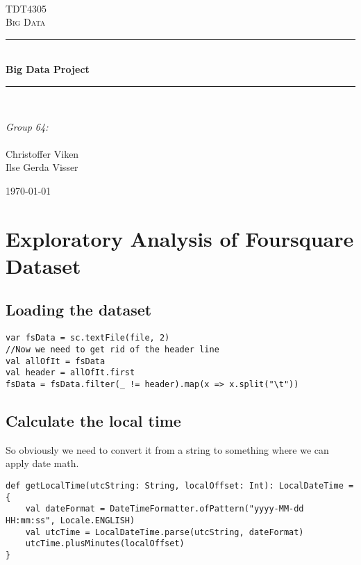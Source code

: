 \documentclass[abstract=on]{article}
\title{\mytitle}
\author{\myauthor}
\date{\today}
\newcommand{\mytitle}{Big Data Project}
\newcommand{\mygroupnumber}{64}
\newcommand{\myauthor}{Christoffer Viken\\Ilse Gerda Visser}
\begin{document}
\begin{titlepage}
\begin{center}

 
~\\[1.5cm]

\textsc{\Large TDT4305\\Big Data}\\[0.5cm]

\hrule ~\\[0.2cm]
{\huge \bfseries \mytitle}\\[0.4cm]   %
\hrule ~\\[1.5cm]

\begin{minipage}{0.4\textwidth}
    \centering
  \large
    \emph{Group \mygroupnumber:}\\~\\
    \myauthor
\end{minipage}

\vfill

{\large \today}
\end{center}
\end{titlepage}




\section{Exploratory Analysis of Foursquare Dataset}

\subsection{Loading the dataset}
\begin{lstlisting}
var fsData = sc.textFile(file, 2)
//Now we need to get rid of the header line
val allOfIt = fsData
val header = allOfIt.first
fsData = fsData.filter(_ != header).map(x => x.split("\t"))
\end{lstlisting}

\subsection{Calculate the local time}
So obviously we need to convert it from a string to something where we can apply date math.
\begin{lstlisting}
def getLocalTime(utcString: String, localOffset: Int): LocalDateTime = {
    val dateFormat = DateTimeFormatter.ofPattern("yyyy-MM-dd HH:mm:ss", Locale.ENGLISH)
    val utcTime = LocalDateTime.parse(utcString, dateFormat)
    utcTime.plusMinutes(localOffset)
}
\end{lstlisting}
\end{document}
